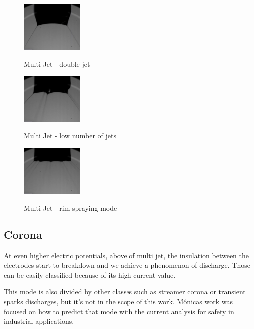 \begin{multicols}{3}

  \begin{figure}[H]
      \center
      \includegraphics[width=3cm]{Figuras/april/multi2.png}
      \label{fig:multijt1}
      \caption{Multi Jet - double jet}
  \end{figure}


  \begin{figure}[H]
      \center
      \includegraphics[width=3cm]{Figuras/april/multi1.png}
      \label{fig:multijt2}
      \caption{Multi Jet - low number of jets}
  \end{figure}


  \begin{figure}[H]
      \center
      \includegraphics[width=3cm]{Figuras/april/multi3.png}
      \label{fig:multijt3}
      \caption{Multi Jet - rim spraying mode}
  \end{figure}

\end{multicols}


\subsection{Corona}
\label{subsec:Corona}

At even higher electric potentials, above of multi jet, the insulation between the electrodes start to breakdown and we achieve a phenomenon of discharge.
Those can be easily classified because of its high current value. 

This mode is also divided by other classes such as streamer corona or transient sparks discharges, but it's not in the scope of this work. 
Mônicas\cite{Monica} work was focused on how to predict that mode with the current analysis for safety in industrial applications.



\clearpage
